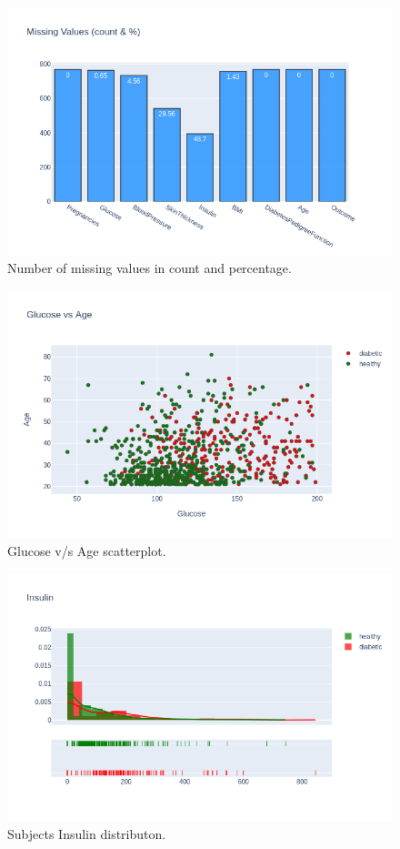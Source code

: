 \documentclass[12pt]{article}
\begin{document}
\begin{figure}[ht]
\centering
\includegraphics[width=1\textwidth]{4.png}
\caption{\label{fig:12} Number of missing values in count and percentage.}
\end{figure}

\begin{figure}[ht]
\centering
\includegraphics[width=1\textwidth]{5.png}
\caption{\label{fig:13} Glucose v/s Age scatterplot.}
\end{figure}

\begin{figure}[ht]
\centering
\includegraphics[width=1\textwidth]{6.png}
\caption{\label{fig:14} Subjects Insulin distributon.}
\end{figure}
\end{document}
